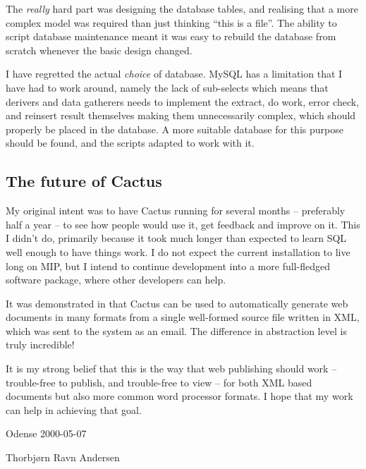 The \textit{really} hard part was designing the database tables, and
realising that a more complex model was required than just thinking
``this is a file''.  The ability to script database maintenance
meant it was easy to rebuild the database from scratch whenever the
basic design changed.  

I have regretted the actual \textit{choice} of database.  MySQL has a
limitation that I have had to work around, namely the lack of
sub-selects which means that derivers and data gatherers needs to
implement the extract, do work, error check, and reinsert result
themselves making them unnecessarily complex, which should properly be
placed in the database.   A more suitable database for this purpose
should be found, and the scripts adapted to work with it.


\subsection*{The future of Cactus}

My original intent was to have Cactus running for several months --
preferably half a year -- to see how people would use it, get feedback
and improve on it.  This I didn't do, primarily because it took much
longer than expected to learn SQL well enough to have things work.  I
do not expect the current installation to live long on MIP, but I
intend to continue development into a more full-fledged software
package, where other developers can help.

It was demonstrated in  that Cactus can be
used to automatically generate web documents in many formats from a
single well-formed source file written in XML, which was sent to the
system as an email.   The difference in abstraction level is truly
incredible!

It is my strong belief that this is the way that web publishing should
work -- trouble-free to publish, and trouble-free to view -- for both
XML based documents but also more common word processor formats.  I hope
that my work can help in achieving that goal.




\begin{center}

\vspace{2cm}
Odense 2000-05-07

\vspace{2cm}
Thorbj{\o}rn Ravn Andersen

\end{center}


